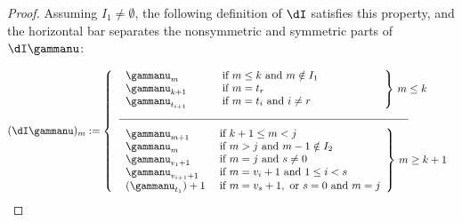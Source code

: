 \begin{proof}
Assuming $I_1 \neq \emptyset$, the following definition of $\dI$ satisfies this property, and the horizontal bar separates the nonsymmetric and symmetric parts of $\dI\gammanu$:

\[ (\dI\gammanu)_m := \left\{\begin{tabular}{l l} $ \left.\begin{array}{l l} \gammanu_m  &\text{ if } m\leq k \text{ and } m\notin I_1 \\
\gammanu_{k+1} \hspace*{.7cm} &\text{ if } m=t_r\\
\gammanu_{t_{i+1}} &\text{ if } m=t_i \text{ and } i\neq r\end{array} \hspace{2cm} \right\} \, m \leq k$ \\
\underline{\hspace{9.5cm}}\\[2mm] $\left.\begin{array}{l l} \gammanu_{m+1} &\text{ if } k+1 \leq m < j\\
\gammanu_m &\text{ if } m>j \text{ and } m-1\notin I_2\\
\gammanu_{v_1+1} &\text{ if } m=j \text{ and } s\neq 0\\
\gammanu_{v_{i+1}+1} &\text{ if } m=v_i+1 \text{ and } 1 \leq i < s\\
(\gammanu_{t_1}) + 1&\text{ if } m=v_s+1 , \text{ or }  s=0 \text{ and } m = j \hspace*{0cm} \end{array} \right\} \, m \geq k+1 $ \end{tabular}  \right.\\[1mm]\]


\end{proof}
